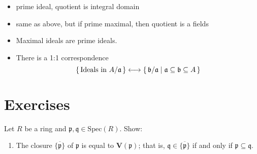 \begin{thm}
    \begin{itemize}
        \item prime ideal, quotient is integral domain
        \item same as above, but if prime maximal, then quotient is a fields
        \item Maximal ideals are prime ideals.
        \item There is a 1:1 correspondence
        \begin{equation}
            \left\{\, \text{Ideals in \(A / \mathfrak{a}\)} \,\right\} \longleftrightarrow \left\{\, \mathfrak{b} / \mathfrak{a} \mathrel{\mid} \mathfrak{a} \subseteq \mathfrak{b} \subseteq A \,\right\}
        \end{equation}
    \end{itemize}
\end{thm}

\section{Exercises}
\begin{exr}
    Let \(R\) be a ring and \(\mathfrak{p}, \mathfrak{q} \in \mathrm{Spec}(R)\). Show:
    \begin{enumerate}
        \item The closure \(\overline{\{\mathfrak{p}\}}\) of \(\mathfrak{p}\) is equal to \(\mathbf{V}(\mathfrak{p})\); that is, \(\mathfrak{q} \in \overline{\{\mathfrak{p}\}}\) if and only if \(\mathfrak{p} \subseteq \mathfrak{q}\).
    \end{enumerate}
\end{exr}